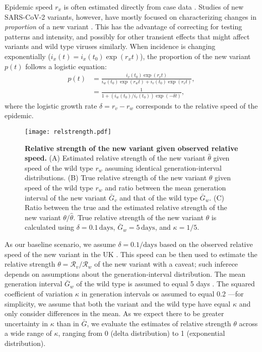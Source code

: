 \documentclass[12pt]{article}
\newcommand{\RR}{\ensuremath{{\mathcal R}}\xspace}
\begin{document}
Epidemic speed $r_x$ is often estimated directly from case data \citep{mills2004transmissibility,nishiura2009transmission,ma2014estimating}.
Studies of new SARS-CoV-2 variants, however, have mostly focused on characterizing changes in \emph{proportion} of a new variant \citep{switzerland2021variant, davies2021estimated, di2021impact, leung2021early, volz2021transmission,zhao2021}.
This has the advantage of correcting for testing patterns and intensity, and possibly for other transient effects that might affect variants and wild type viruses similarly.
When incidence is changing exponentially ($i_x(t) = i_x(t_0) \exp(r_x t)$), the proportion of the new variant $p(t)$ follows a logistic equation:
\begin{align}
p(t) &= \frac{i_v(t_0) \exp(r_v t)}{i_w(t_0) \exp(r_w t) + i_v(t_0) \exp(r_v t)},
\\ &= \frac{1}{1 + \left(i_w(t_0)/i_v(t_0)\right) \exp(-\delta t)},
\end{align}
where the logistic growth rate $\delta = r_v - r_w$ corresponds to the relative speed of the epidemic.

\begin{figure}[!th]
\texttt{[image: relstrength.pdf]}
\caption{
\textbf{Relative strength of the new variant given observed relative speed.}
(A) Estimated relative strength of the new variant $\hat{\theta}$ given speed of the wild type
$r_w$ assuming identical generation-interval distributions.
(B) True relative strength of the new variant $\theta$ given speed of the wild type $r_w$ and ratio between the mean generation interval of the new variant $\bar{G}_v$ and that of the wild type $\bar{G}_w$.
(C) Ratio between the true and the estimated relative strength of the new variant $\theta/\hat{\theta}$.
True relative strength of the new variant $\theta$ is calculated using $\delta=0.1\,\textrm{days}$, $\bar{G}_w = 5\,\textrm{days}$, and $\kappa = 1/5$.
}
\label{fig:relstrength}
\end{figure}

As our baseline scenario, we assume $\delta = 0.1/\textrm{days}$ based on the observed relative speed of the new variant in the UK \citep{davies2021estimated}.
This speed can be then used to estimate the relative strength $\theta = \RR_v/\RR_w$ of the new variant with a caveat; such inferece depends on assumptions about the generation-interval distribution.
The mean generation interval $\bar{G}_w$ of the wild type is assumed to equal 5 days \citep{ferretti2020quantifying}.
The squared coefficient of variation $\kappa$ in generation intervals os assumed to equal 0.2 \citep{ferretti2020quantifying}---for simplicity, we assume that both the variant and the wild type have equal $\kappa$ and only consider differences in the mean.
As we expect there to be greater uncertainty in $\kappa$ than in $\bar{G}$, we evaluate the estimates of relative strength $\theta$ across a wide range of $\kappa$, ranging from 0 (delta distribution) to 1 (exponential distribution).
\end{document}
